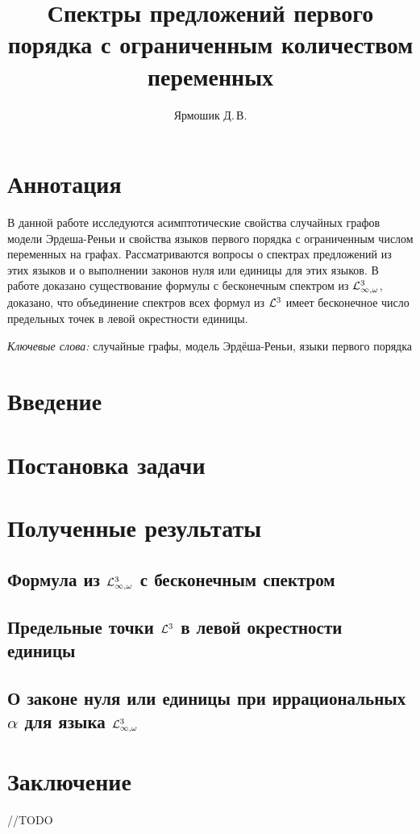 \documentclass{mipt-thesis-bs}
\title{Спектры предложений первого порядка с ограниченным количеством переменных}
\author{Ярмошик Д.\,В.}
\begin{document}
\frontmatter
\titlecontents

\mainmatter

\chapter{Аннотация}
В данной работе исследуются асимптотические свойства случайных графов модели Эрдеша-Реньи и свойства языков первого порядка с ограниченным числом переменных на графах. Рассматриваются вопросы о спектрах предложений из этих языков и о выполнении законов нуля или единицы для этих языков. В работе доказано существование формулы с бесконечным спектром из $\mathcal{L}^3_{\infty, \omega}$, доказано, что объединение спектров всех формул из $\mathcal{L}^3$ имеет бесконечное число предельных точек в левой окрестности единицы.

\textit{Ключевые слова:} случайные графы, модель Эрдёша-Реньи, языки первого порядка

\chapter{Введение}


\chapter{Постановка задачи}


\chapter{Полученные результаты}
\section{Формула из $\mathcal{L}^3_{\infty, \omega}$ с бесконечным спектром}


\section{Предельные точки $\mathcal{L}^3$ в левой окрестности единицы}


\section{О законе нуля или единицы при иррациональных $\alpha$ для языка $\mathcal{L}^3_{\infty, \omega}$}


\chapter{Заключение}
//TODO

\backmatter


\end{document}
